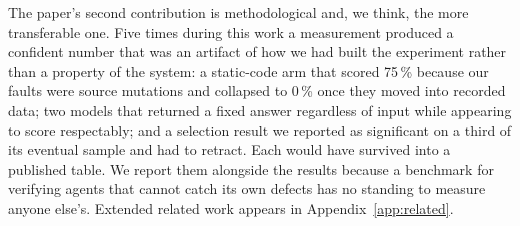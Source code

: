The paper's second contribution is methodological and, we think, the more transferable one.
Five times during this work a measurement produced a confident number that was an artifact
of how we had built the experiment rather than a property of the system: a static-code arm
that scored 75\,\% because our faults were source mutations and collapsed to 0\,\% once
they moved into recorded data; two models that returned a fixed answer regardless of input
while appearing to score respectably; and a selection result we reported as significant on a
third of its eventual sample and had to retract. Each would have survived into a published
table. We report them alongside the results because a benchmark for verifying agents that
cannot catch its own defects has no standing to measure anyone else's.
Extended related work appears in Appendix~\ref{app:related}.
